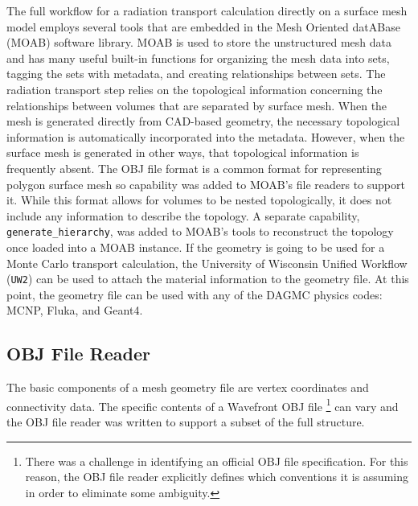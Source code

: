 \documentclass{anstrans}
\begin{document}
The full workflow for a radiation transport calculation directly on a surface mesh model
employs several tools that are embedded in the Mesh Oriented datABase (MOAB) software library\cite{moab}.
MOAB is used to store the unstructured mesh data 
and has many useful built-in functions for organizing the mesh data into sets, 
tagging the sets with metadata, and creating relationships between sets.  The radiation transport step relies 
on the topological information concerning the relationships between volumes that are separated by surface mesh.
When the mesh is generated directly from CAD-based geometry, the necessary topological information
is automatically incorporated into the metadata.  However, when the surface mesh is generated in other
ways, that topological information is frequently absent.  The OBJ file format\cite{obj} is a common format for
representing polygon surface mesh so capability was
added to MOAB's file readers to support it.  While this format allows for volumes to be
nested topologically, it does not include any information to describe the topology.  A separate capability, 
\texttt{generate\_hierarchy}, was added to MOAB's tools to reconstruct the topology once loaded into a MOAB instance.
If the geometry is going to be used 
for a Monte Carlo transport calculation, the University of Wisconsin Unified Workflow (\texttt{UW2}) can be used to attach 
the material information to the geometry file.  At this point, the geometry file
can be used with any of the DAGMC physics codes: MCNP, Fluka, and Geant4.

\subsection{OBJ File Reader}
The basic components of a mesh geometry file are vertex coordinates and connectivity data.
The specific contents of a Wavefront OBJ file \footnote{There was a challenge in identifying an official OBJ file specification.  
For this reason, the OBJ file reader explicitly defines which conventions it is assuming in order to eliminate some ambiguity.}
can vary and the OBJ file reader was written to support a subset of the full structure. 
\end{document}

